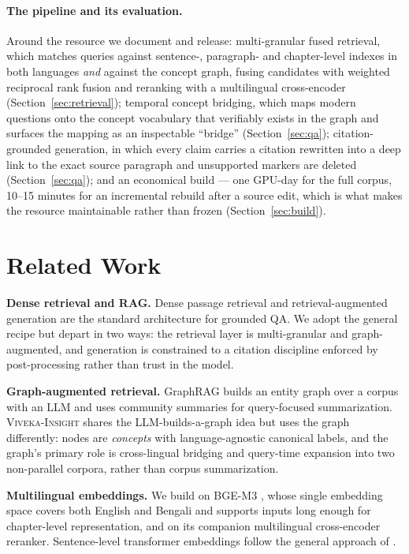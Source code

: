 \documentclass[pdflatex,sn-mathphys-num]{sn-jnl}
\newcommand{\system}{\textsc{Viveka-Insight}}
\begin{document}
\paragraph{The pipeline and its evaluation.} Around the resource we
document and release: multi-granular fused retrieval, which matches
queries against sentence-, paragraph- and chapter-level indexes in both
languages \emph{and} against the concept graph, fusing candidates with
weighted reciprocal rank fusion \cite{cormack2009rrf} and reranking with a
multilingual cross-encoder (Section~\ref{sec:retrieval}); temporal
concept bridging, which maps modern questions onto the concept vocabulary
that verifiably exists in the graph and surfaces the mapping as an
inspectable ``bridge'' (Section~\ref{sec:qa}); citation-grounded
generation, in which every claim carries a citation rewritten into a deep
link to the exact source paragraph and unsupported markers are deleted
(Section~\ref{sec:qa}); and an economical build --- one GPU-day for the
full corpus, 10--15 minutes for an incremental rebuild after a source
edit, which is what makes the resource maintainable rather than frozen
(Section~\ref{sec:build}).

\section{Related Work}

\textbf{Dense retrieval and RAG.} Dense passage retrieval
\cite{karpukhin2020dpr} and retrieval-augmented generation
\cite{lewis2020rag,gao2023ragsurvey} are the standard architecture for
grounded QA. We adopt the general recipe but depart in two ways: the
retrieval layer is multi-granular and graph-augmented, and generation is
constrained to a citation discipline enforced by post-processing rather
than trust in the model.

\textbf{Graph-augmented retrieval.} GraphRAG \cite{edge2024graphrag}
builds an entity graph over a corpus with an LLM and uses community
summaries for query-focused summarization. \system{} shares the
LLM-builds-a-graph idea but uses the graph differently: nodes are
\emph{concepts} with language-agnostic canonical labels, and the graph's
primary role is cross-lingual bridging and query-time expansion into two
non-parallel corpora, rather than corpus summarization.

\textbf{Multilingual embeddings.} We build on BGE-M3
\cite{chen2024bgem3}, whose single embedding space covers both English
and Bengali and supports inputs long enough for chapter-level
representation, and on its companion multilingual cross-encoder reranker.
Sentence-level transformer embeddings follow the general approach of
\cite{reimers2019sbert}.
\end{document}
